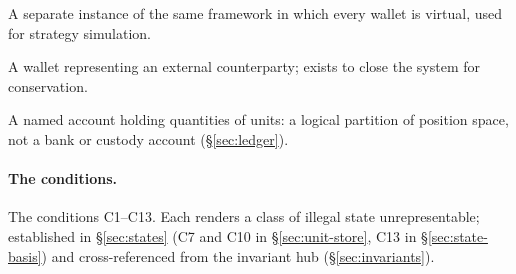\documentclass[11pt,a4paper]{article}
\begin{document}
\begin{description}[style=nextline]
\item[Virtual ledger] A separate instance of the same framework in which every wallet is virtual, used for strategy simulation.

\item[Virtual wallet] A wallet representing an external counterparty; exists to close the system for conservation.

\item[Wallet] A named account holding quantities of units: a logical partition of position space, not a bank or custody account (\S\ref{sec:ledger}).

\end{description}

\paragraph{The conditions.}
The conditions C1--C13. Each renders a class of illegal state unrepresentable; established in \S\ref{sec:states} (C7 and C10 in \S\ref{sec:unit-store}, C13 in \S\ref{sec:state-basis}) and cross-referenced from the invariant hub (\S\ref{sec:invariants}).
\end{document}
